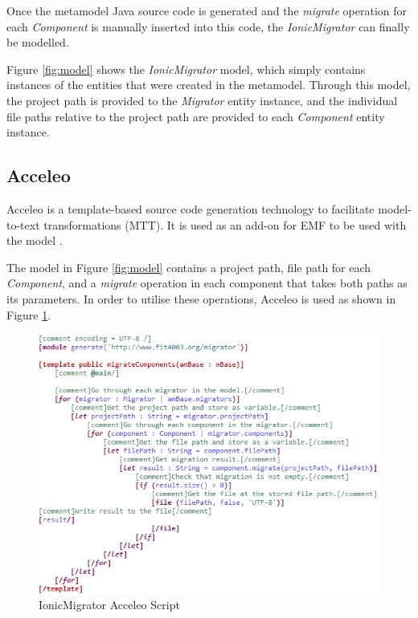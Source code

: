 \documentclass[conference]{IEEEtran}
\begin{document}
Once the metamodel Java source code is generated and the \textit{migrate} operation for each \textit{Component} is manually inserted into this code, the \textit{IonicMigrator} can finally be modelled.

Figure \ref{fig:model} shows the \textit{IonicMigrator} model, which simply contains instances of the entities that were created in the metamodel. Through this model, the project path is provided to the \textit{Migrator} entity instance, and the individual file paths relative to the project path are provided to each \textit{Component} entity instance.

\subsection{Acceleo}

Acceleo is a template-based source code generation technology to facilitate model-to-text transformations (MTT). It is used as an add-on for EMF to be used with the model \cite{b13}.

The model in Figure \ref{fig:model} contains a project path, file path for each \textit{Component}, and a \textit{migrate} operation in each component that takes both paths as its parameters. In order to utilise these operations, Acceleo is used as shown in Figure \ref{fig:acceleo}.

\begin{figure}[htbp]
\centerline{\includegraphics[width=\linewidth,keepaspectratio]{acceleo.png}}
\caption{IonicMigrator Acceleo Script}
\label{fig:acceleo}
\end{figure}
\end{document}
